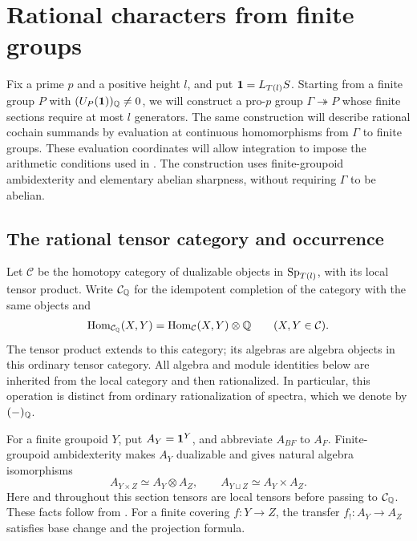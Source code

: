 \section{Rational characters from finite groups}\label{sec:characters}

Fix a prime $p$ and a positive height $l$, and put
$\mathbf1=L_{T(l)}S$.  Starting from a finite group $P$ with
$(U_P(\mathbf1))_{\mathbb Q}\ne0$, we will construct a pro-$p$ group
$\Gamma\twoheadrightarrow P$ whose finite sections require at most $l$
generators.  The same construction will describe rational cochain summands
by evaluation at continuous homomorphisms from $\Gamma$ to finite groups.
These evaluation coordinates will allow integration to impose the arithmetic conditions used in
.  The construction uses finite-groupoid ambidexterity
and elementary abelian sharpness, without requiring $\Gamma$ to be abelian.

\subsection{The rational tensor category and occurrence}

Let $\mathcal C$ be the homotopy category of dualizable objects in
$\mathrm{Sp}_{T(l)}$, with its local tensor product.  Write $\mathcal C_{\mathbb Q}$ for
the idempotent completion of the category with the same objects and
\[
 \operatorname{Hom}_{\mathcal C_{\mathbb Q}}(X,Y)
 =\operatorname{Hom}_{\mathcal C}(X,Y)\otimes\mathbb Q
 \qquad (X,Y\in\mathcal C).
\]
The tensor product extends to this category; its algebras are algebra
objects in this ordinary tensor category.  All algebra and module
identities below are inherited from the local category and then
rationalized.  In particular, this operation is distinct from ordinary
rationalization of spectra, which we denote by $(-)_{\mathbb Q}$.

For a finite groupoid $Y$, put $A_Y=\mathbf1^Y$, and abbreviate $A_{BF}$ to
$A_F$.  Finite-groupoid ambidexterity makes $A_Y$ dualizable and gives
natural algebra isomorphisms
\begin{equation}\label{eq:cochain-products}
 A_{Y\times Z}\simeq A_Y\otimes A_Z,
 \qquad
 A_{Y\sqcup Z}\simeq A_Y\times A_Z.
\end{equation}
Here and throughout this section tensors are local tensors before passing
to $\mathcal C_{\mathbb Q}$.  These facts follow from
\cite[Theorem~5.3.1 and Propositions~3.3.1, 3.3.7]{CSY}.
For a finite covering $f:Y\to Z$, the transfer $f_!:A_Y\to A_Z$ satisfies
base change and the projection formula.


